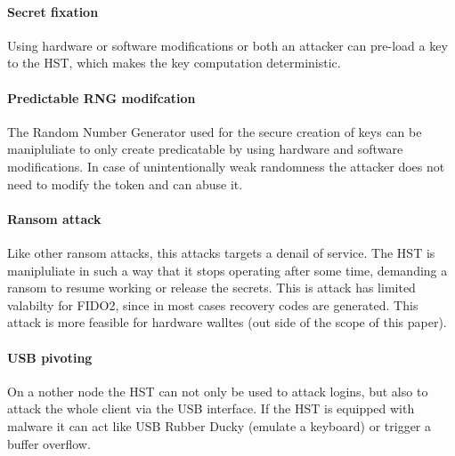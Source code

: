 \documentclass[runningheads]{llncs}
\begin{document}
\paragraph{Secret fixation}
Using hardware or software modifications or both an attacker can pre-load a key to the HST, which makes the key computation deterministic. 

\paragraph{Predictable RNG modifcation}
The Random Number Generator used for the secure creation of keys can be manipluliate to only create predicatable by using hardware and software modifications. In case of unintentionally weak randomness the attacker does not need to modify the token and can abuse it.

\paragraph{Ransom attack}
Like other ransom attacks, this attacks targets a denail of service. The HST is manipluliate in such a way that it stops operating after some time, demanding a ransom to resume working or release the secrets. This is attack has limited valabilty for FIDO2, since in most cases recovery codes are generated. This attack is more feasible for hardware walltes (out side of the scope of this paper).

\paragraph{USB pivoting}
On a nother node the HST can not only be used to attack logins, but also to attack the whole client via the USB interface. If the HST is equipped with malware it can act like USB Rubber Ducky (emulate a keyboard) or trigger a buffer overflow.
\end{document}
